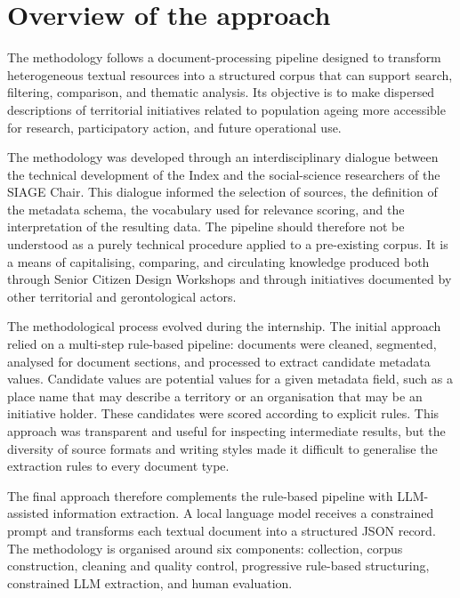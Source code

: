 

\section{Overview of the approach}

The methodology follows a document-processing pipeline designed to transform
heterogeneous textual resources into a structured corpus that can support search,
filtering, comparison, and thematic analysis. Its objective is to make dispersed
descriptions of territorial initiatives related to population ageing more accessible
for research, participatory action, and future operational use.

The methodology was developed through an interdisciplinary dialogue between the
technical development of the Index and the social-science researchers of the SIAGE
Chair. This dialogue informed the selection of sources, the definition of the
metadata schema, the vocabulary used for relevance scoring, and the interpretation
of the resulting data. The pipeline should therefore not be understood as a purely
technical procedure applied to a pre-existing corpus. It is a means of
capitalising, comparing, and circulating knowledge produced both through Senior
Citizen Design Workshops and through initiatives documented by other territorial
and gerontological actors.

The methodological process evolved during the internship. The initial approach
relied on a multi-step rule-based pipeline: documents were cleaned, segmented,
analysed for document sections, and processed to extract candidate metadata
values. Candidate values are potential values for a given metadata field, such as
a place name that may describe a territory or an organisation that may be an
initiative holder. These candidates were scored according to explicit rules. This
approach was transparent and useful for inspecting intermediate results, but the
diversity of source formats and writing styles made it difficult to generalise the
extraction rules to every document type.

The final approach therefore complements the rule-based pipeline with LLM-assisted
information extraction. A local language model receives a constrained prompt and
transforms each textual document into a structured JSON record. The methodology
is organised around six components: collection, corpus construction, cleaning and
quality control, progressive rule-based structuring, constrained LLM extraction,
and human evaluation.

